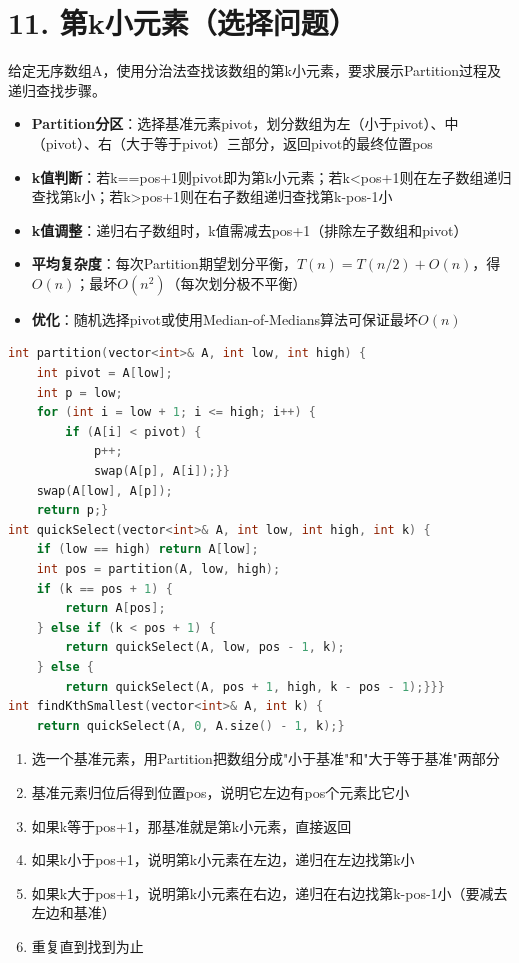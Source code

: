 \section*{11. 第k小元素（选择问题）}

给定无序数组A，使用分治法查找该数组的第k小元素，要求展示Partition过程及递归查找步骤。

\begin{itemize}
    \item \textbf{Partition分区}：选择基准元素pivot，划分数组为左（小于pivot）、中（pivot）、右（大于等于pivot）三部分，返回pivot的最终位置pos
    \item \textbf{k值判断}：若k==pos+1则pivot即为第k小元素；若k<pos+1则在左子数组递归查找第k小；若k>pos+1则在右子数组递归查找第k-pos-1小
    \item \textbf{k值调整}：递归右子数组时，k值需减去pos+1（排除左子数组和pivot）
    \item \textbf{平均复杂度}：每次Partition期望划分平衡，$T(n)=T(n/2)+O(n)$，得$O(n)$；最坏$O(n^2)$（每次划分极不平衡）
    \item \textbf{优化}：随机选择pivot或使用Median-of-Medians算法可保证最坏$O(n)$
\end{itemize}

\begin{lstlisting}[language=C++, style=cppstyle]
int partition(vector<int>& A, int low, int high) {
    int pivot = A[low];
    int p = low;
    for (int i = low + 1; i <= high; i++) {
        if (A[i] < pivot) {
            p++;
            swap(A[p], A[i]);}}
    swap(A[low], A[p]);
    return p;}
int quickSelect(vector<int>& A, int low, int high, int k) {
    if (low == high) return A[low];
    int pos = partition(A, low, high);
    if (k == pos + 1) {
        return A[pos];
    } else if (k < pos + 1) {
        return quickSelect(A, low, pos - 1, k);
    } else {
        return quickSelect(A, pos + 1, high, k - pos - 1);}}}
int findKthSmallest(vector<int>& A, int k) {
    return quickSelect(A, 0, A.size() - 1, k);}
\end{lstlisting}

\begin{enumerate}
    \item 选一个基准元素，用Partition把数组分成"小于基准"和"大于等于基准"两部分
    \item 基准元素归位后得到位置pos，说明它左边有pos个元素比它小
    \item 如果k等于pos+1，那基准就是第k小元素，直接返回
    \item 如果k小于pos+1，说明第k小元素在左边，递归在左边找第k小
    \item 如果k大于pos+1，说明第k小元素在右边，递归在右边找第k-pos-1小（要减去左边和基准）
    \item 重复直到找到为止
\end{enumerate}

